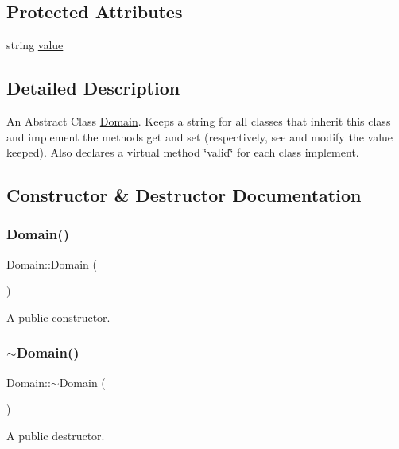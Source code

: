 \subsection*{Protected Attributes}
\begin{DoxyCompactItemize}
\item 
string \hyperlink{class_domain_a9d15a9f2c19c5863fe863a7d2f53a7cc}{value}
\end{DoxyCompactItemize}


\subsection{Detailed Description}
An Abstract Class \hyperlink{class_domain}{Domain}. Keeps a string for all classes that inherit this class and implement the methods get and set (respectively, see and modify the value keeped). Also declares a virtual method \char`\"{}valid\char`\"{} for each class implement. 

\subsection{Constructor \& Destructor Documentation}
\mbox{\label{class_domain_a6adccae537e53d4fde2b70f875e6b8d0}} 
\subsubsection{\texorpdfstring{Domain()}{Domain()}}
{\footnotesize\ttfamily Domain\+::\+Domain (\begin{DoxyParamCaption}{ }\end{DoxyParamCaption})}

A public constructor. \mbox{\label{class_domain_a29cec9afb2e54c810ba1f3c1a49543a8}} 
\subsubsection{\texorpdfstring{$\sim$\+Domain()}{~Domain()}}
{\footnotesize\ttfamily Domain\+::$\sim$\+Domain (\begin{DoxyParamCaption}{ }\end{DoxyParamCaption})}

A public destructor. 

